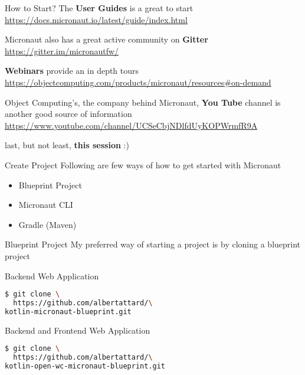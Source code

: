 \documentclass{beamer}
\begin{document}
  \begin{frame}[t]{How to Start?}
    The \textbf{User Guides} is a great to start
    \newline
    {\footnotesize \href{https://docs.micronaut.io/latest/guide/index.html}{https://docs.micronaut.io/latest/guide/index.html}}

    Micronaut also has a great active community on \textbf{Gitter}
    \newline
    {\footnotesize \href{https://gitter.im/micronautfw/}{https://gitter.im/micronautfw/}}

    \textbf{Webinars} provide an in depth tours
    \newline
    {\footnotesize \href{https://objectcomputing.com/products/micronaut/resources\#on-demand}{https://objectcomputing.com/products/micronaut/resources\#on-demand}}

    Object Computing's, the company behind Micronaut, \textbf{You Tube} channel is another good source of information
    \newline
    {\footnotesize \href{https://www.youtube.com/channel/UCSeCbjNDlfdUyKOPWrmfR9A}{https://www.youtube.com/channel/UCSeCbjNDlfdUyKOPWrmfR9A}}

    last, but not least, \textbf{this session} :)
  \end{frame}


  \begin{frame}[t]{Create Project}
    Following are few ways of how to get started with Micronaut

    \begin{itemize}
      \item Blueprint Project
      \item Micronaut CLI
      \item Gradle (Maven)
    \end{itemize}
  \end{frame}


  \begin{frame}[t,fragile]{Blueprint Project}
    My preferred way of starting a project is by cloning a blueprint project

    Backend Web Application
    \begin{lstlisting}[language=bash, backgroundcolor = \color{green!5}]
$ git clone \
  https://github.com/albertattard/\
kotlin-micronaut-blueprint.git
    \end{lstlisting}

    Backend and Frontend Web Application
    \begin{lstlisting}[language=bash, backgroundcolor = \color{green!5}]
$ git clone \
  https://github.com/albertattard/\
kotlin-open-wc-micronaut-blueprint.git
\end{lstlisting}
\end{frame}
\end{document}
